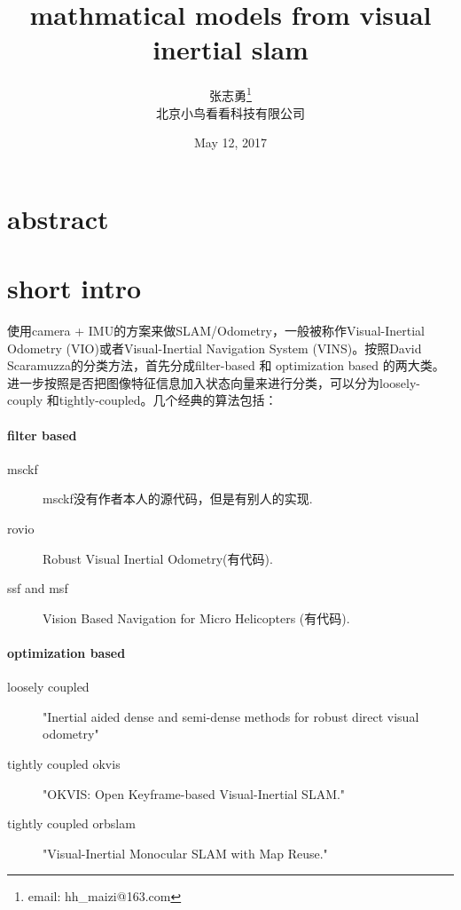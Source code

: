 \documentclass[10pt,a4paper]{article}
\author{张志勇\footnote{email: hh\_maizi@163.com}\\[2ex]
    北京小鸟看看科技有限公司\\[2ex]}
\title{mathmatical models from visual inertial slam}
\date{May 12, 2017}
\begin{document}
\makeatletter
\let\@afterindentfalse\@afterindenttrue
\@afterindenttrue
\makeatother
\setlength{\parindent}{2em}  %

\maketitle


\section{abstract}




\section{short intro}
使用camera + IMU的方案来做SLAM/Odometry，一般被称作Visual-Inertial Odometry (VIO)或者Visual-Inertial Navigation System (VINS)。按照David Scaramuzza的分类方法，首先分成filter-based 和 optimization based 的两大类。进一步按照是否把图像特征信息加入状态向量来进行分类，可以分为loosely-couply 和tightly-coupled。几个经典的算法包括：
\paragraph{filter based}
\begin{description}
	\item[msckf] msckf没有作者本人的源代码，但是有别人的实现.
	\item[rovio] Robust Visual Inertial Odometry(有代码).
	\item[ssf and msf] Vision Based Navigation for Micro Helicopters (有代码).
\end{description}

\paragraph{optimization based}
\begin{description}
	\item[loosely coupled] "Inertial aided dense and semi-dense methods for robust direct visual odometry" 
	\item[tightly coupled okvis] "OKVIS: Open Keyframe-based Visual-Inertial SLAM."
	\item[tightly coupled orbslam] "Visual-Inertial Monocular SLAM with Map Reuse."
\end{description}
\end{document}
